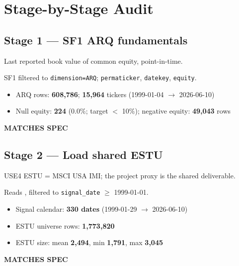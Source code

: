 \documentclass[11pt,a4paper]{article}
\newcommand{\PASS}[1]{\textcolor{pass}{\textbf{#1}}}
\begin{document}
\section{Stage-by-Stage Audit}

\subsection{Stage 1 --- SF1 ARQ fundamentals}

\begin{description}[style=nextline]
  \item[PDF SPEC] Last reported book value of common equity, point-in-time.
  \item[Implementation] SF1 filtered to \texttt{dimension=\allowbreak ARQ}; \texttt{permaticker}, \texttt{datekey}, \texttt{equity}.
  \item[Observed]\phantom{x}
    \begin{itemize}[nosep, topsep=-\parskip]
      \item ARQ rows: \textbf{608{,}786}; \textbf{15{,}964} tickers (1999-01-04 $\to$ 2026-06-10)
      \item Null equity: \textbf{224} (0.0\%; target $<$ 10\%); negative equity: \textbf{49{,}043} rows
    \end{itemize}
  \item[Status] \PASS{MATCHES SPEC}
\end{description}

\subsection{Stage 2 --- Load shared ESTU}

\begin{description}[style=nextline]
  \item[PDF SPEC] USE4 ESTU = MSCI USA IMI; the project proxy is the shared  deliverable.
  \item[Implementation] Reads , filtered to \texttt{signal\_date} $\geq$ 1999-01-01.
  \item[Observed]\phantom{x}
    \begin{itemize}[nosep, topsep=-\parskip]
      \item Signal calendar: \textbf{330 dates} (1999-01-29 $\to$ 2026-06-10)
      \item ESTU universe rows: \textbf{1{,}773{,}820}
      \item ESTU size: mean \textbf{2{,}494}, min \textbf{1{,}791}, max \textbf{3{,}045}
    \end{itemize}
  \item[Status] \PASS{MATCHES SPEC}
\end{description}
\end{document}
